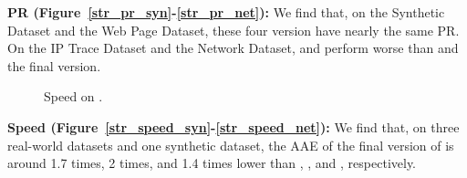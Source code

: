 			
\noindent\textbf{PR (Figure~\ref{str_pr_syn}-\ref{str_pr_net}):}
We find that, on the Synthetic Dataset and the Web Page Dataset, these four version have nearly the same PR. On the IP Trace Dataset and the Network Dataset, \secss{} and \secmin{} perform worse than \secarr{} and the final version. 
			
\begin{figure*}[!ht]
	\centering

			
				\caption{Speed on \taskpara.}
				\label{str_speed}
				
			\end{figure*}
			
			
\noindent\textbf{Speed (Figure~\ref{str_speed_syn}-\ref{str_speed_net}):}
We find that, on three real-world datasets and one synthetic dataset, the AAE of the final version of \sketchname{} is around 1.7 times, 2 times, and 1.4 times lower than \secmin, \secss, and \secarr, respectively. 

